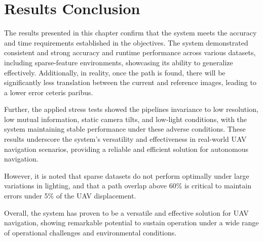 \section{Results Conclusion}

The results presented in this chapter confirm that the system meets the accuracy and time requirements established in the objectives. The system demonstrated consistent and strong accuracy and runtime performance across various datasets, including sparse-feature environments, showcasing its ability to generalize effectively. Additionally, in reality, once the path is found, there will be significantly less translation between the current and reference images, leading to a lower error ceteris 
paribus.

Further, the applied stress tests showed the pipelines invariance to low resolution, low mutual information, static camera tilts, and low-light conditions, with the system maintaining stable performance under these adverse conditions. These results underscore the system's versatility and effectiveness in real-world UAV navigation scenarios, providing a reliable and efficient solution for autonomous navigation.

However, it is noted that sparse datasets do not perform optimally under large variations in lighting, and that a path overlap above 60\% is critical to maintain errors under 5\% of the UAV displacement. 

Overall, the system has proven to be a versatile and effective solution for UAV navigation, showing remarkable potential to sustain operation under a wide range of operational challenges and environmental conditions.

